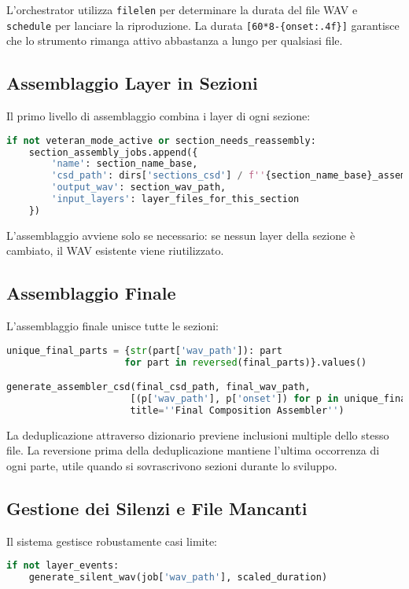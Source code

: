 L'orchestrator utilizza \texttt{filelen} per determinare la durata del file WAV e \texttt{schedule} per lanciare la riproduzione. La durata \texttt{[60*8-\{onset:.4f\}]} garantisce che lo strumento rimanga attivo abbastanza a lungo per qualsiasi file.
\subsection{Assemblaggio Layer in Sezioni}
Il primo livello di assemblaggio combina i layer di ogni sezione:

\begin{lstlisting}[language=Python]
if not veteran_mode_active or section_needs_reassembly:
    section_assembly_jobs.append({
        'name': section_name_base,
        'csd_path': dirs['sections_csd'] / f''{section_name_base}_assembler.csd'',
        'output_wav': section_wav_path,
        'input_layers': layer_files_for_this_section
    })
\end{lstlisting}

L'assemblaggio avviene solo se necessario: se nessun layer della sezione è cambiato, il WAV esistente viene riutilizzato.
\subsection{Assemblaggio Finale}
L'assemblaggio finale unisce tutte le sezioni:

\begin{lstlisting}[language=Python]
unique_final_parts = {str(part['wav_path']): part 
                     for part in reversed(final_parts)}.values()

generate_assembler_csd(final_csd_path, final_wav_path, 
                      [(p['wav_path'], p['onset']) for p in unique_final_parts],
                      title=''Final Composition Assembler'')
\end{lstlisting}

La deduplicazione attraverso dizionario previene inclusioni multiple dello stesso file. La reversione prima della deduplicazione mantiene l'ultima occorrenza di ogni parte, utile quando si sovrascrivono sezioni durante lo sviluppo.
\subsection{Gestione dei Silenzi e File Mancanti}
Il sistema gestisce robustamente casi limite:

\begin{lstlisting}[language=Python]
if not layer_events:
    generate_silent_wav(job['wav_path'], scaled_duration)
\end{lstlisting}

